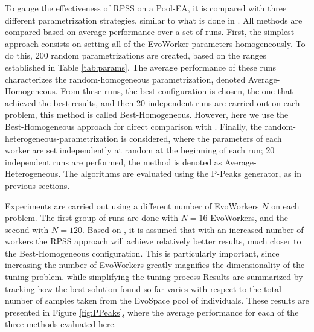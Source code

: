 To gauge the effectiveness of RPSS on a Pool-EA, it is compared with three different parametrization strategies, similar to what is done in \cite{fuku1,fuku2}.
All methods are compared based on average performance over a set of runs.
First, the simplest approach consists on setting all of the EvoWorker parameters homogeneously.
To do this, 200 random parametrizations are created, based on the ranges established in Table \ref{tab:params}.
The average performance of these runs characterizes the random-homogeneous parametrization, denoted Average-Homogeneous.
From these runs, the best configuration is chosen, the one that achieved the best results,
and then 20 independent runs are carried out on each problem, this method is called Best-Homogeneous.
However, here we use the Best-Homogeneous approach for direct comparison with \cite{fuku1,fuku2}.
Finally, the random-heterogeneous-parametrization is considered, where the parameters of each worker are set independently at random at
the beginning of each run; 20 independent runs are performed, the method is denoted as Average-Heterogeneous.
The algorithms are evaluated using the P-Peaks generator, as in previous sections.

Experiments are carried out using a different number of EvoWorkers $N$ on each problem.
The first group of runs are done with $N=16$ EvoWorkers, and the second with $N=120$.
Based on \cite{fuku1,fuku2}, it is assumed that with an increased number of workers the RPSS approach will achieve relatively better results, much closer to
the Best-Homogeneous configuration.
This is particularly important, since increasing the number of EvoWorkers greatly magnifies the dimensionality of the tuning problem.
while simplifying the tuning process
Results are summarized by tracking how the best solution found so far varies with respect to the total
number of samples taken from the EvoSpace pool of individuals.
These results are presented in Figure \ref{fig:PPeaks}, where the average performance for
each of the three methods evaluated here.

